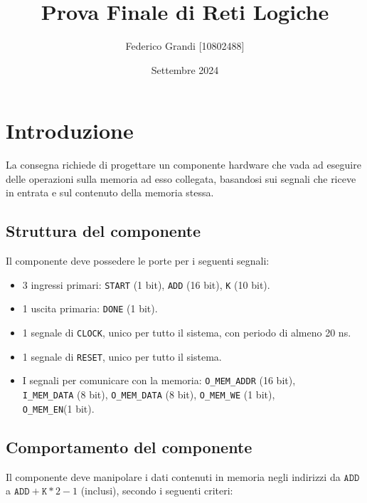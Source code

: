 \documentclass{article}
\title{Prova Finale di Reti Logiche}
\author{Federico Grandi [10802488]}
\date{Settembre 2024}
\begin{document}
\maketitle

\tableofcontents 

\section{Introduzione}

La consegna richiede di progettare un componente hardware che vada ad eseguire delle operazioni sulla memoria ad esso collegata, basandosi sui segnali che riceve in entrata e sul contenuto della memoria stessa.

\subsection{Struttura del componente}
Il componente deve possedere le porte per i seguenti segnali:
\begin{itemize}
    \item 3 ingressi primari: \texttt{START} (1 bit), \texttt{ADD} (16 bit), \texttt{K} (10 bit).
    \item 1 uscita primaria: \texttt{DONE} (1 b{it}).
    \item 1 segnale di \texttt{CLOCK}, unico per tutto il sistema, con periodo di almeno 20 ns.
    \item 1 segnale di \texttt{RESET}, unico per tutto il sistema.
    \item I segnali per comunicare con la memoria: \texttt{O\_MEM\_ADDR} (16 bit), \\
    \texttt{I\_MEM\_DATA} (8 bit), \texttt{O\_MEM\_DATA} (8 bit), \texttt{O\_MEM\_WE} (1 bit), \\ 
    \texttt{O\_MEM\_EN}(1 bit).
\end{itemize}


\subsection{Comportamento del componente}
Il componente deve manipolare i dati contenuti in memoria negli indirizzi da $\texttt{ADD}$ a $\texttt{ADD}+\texttt{K}*2-1$ (inclusi), secondo i seguenti criteri:
\end{document}
